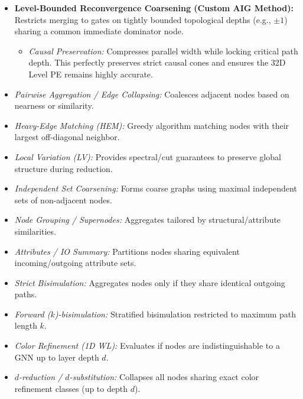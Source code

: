 \documentclass[paper=a4, fontsize=11pt]{scrartcl} %
\numberwithin{equation}{section} %
\numberwithin{figure}{section} %
\numberwithin{table}{section} %
\begin{document}
\begin{itemize}
    \item \textbf{Level-Bounded Reconvergence Coarsening (Custom AIG Method):} Restricts merging to gates on tightly bounded topological depths (e.g., $\pm 1$) sharing a common immediate dominator node.
    \begin{itemize}
        \item \textit{Causal Preservation:} Compresses parallel width while locking critical path depth. This perfectly preserves strict causal cones and ensures the 32D Level PE remains highly accurate.
    \end{itemize}
\end{itemize}


\begin{itemize}
    \item \textit{Pairwise Aggregation / Edge Collapsing:} Coalesces adjacent nodes based on nearness or similarity.
    \item \textit{Heavy-Edge Matching (HEM):} Greedy algorithm matching nodes with their largest off-diagonal neighbor.
    \item \textit{Local Variation (LV):} Provides spectral/cut guarantees to preserve global structure during reduction.
\end{itemize}

\begin{itemize}
    \item \textit{Independent Set Coarsening:} Forms coarse graphs using maximal independent sets of non-adjacent nodes.
    \item \textit{Node Grouping / Supernodes:} Aggregates tailored by structural/attribute similarities.
    \item \textit{Attributes / IO Summary:} Partitions nodes sharing equivalent incoming/outgoing attribute sets.
\end{itemize}


\begin{itemize}
    \item \textit{Strict Bisimulation:} Aggregates nodes only if they share identical outgoing paths.
    \item \textit{Forward ($k$)-bisimulation:} Stratified bisimulation restricted to maximum path length $k$.
    \item \textit{Color Refinement (1D WL):} Evaluates if nodes are indistinguishable to a GNN up to layer depth $d$.
    \item \textit{$d$-reduction / $d$-substitution:} Collapses all nodes sharing exact color refinement classes (up to depth $d$).
\end{itemize}
\end{document}
